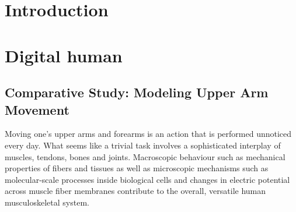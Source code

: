 


\graphicspath{
{images/summer_school_study/png/}{images/summer_school_study/}{images/summer_school_study/plots/}{images/summer_school_study/2018/}
}



\tableofcontents


\part{Introduction}
%  
\part{Digital human}

\chapter{Comparative Study: Modeling Upper Arm Movement}

Moving one's upper arms and forearms is an action that is performed unnoticed every day. 
What seems like a trivial task involves a sophisticated interplay of muscles, tendons, bones and joints. Macroscopic behaviour such as mechanical properties of fibers and tissues as well as microscopic mechanisms such as molecular-scale processes inside biological cells and changes in electric potential across muscle fiber membranes contribute to the overall, versatile human musculoskeletal system.

